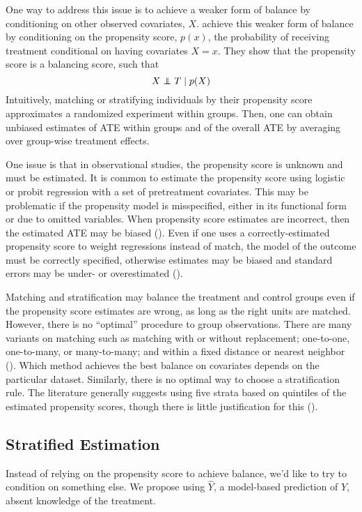 \documentclass[12pt]{article}
\newcommand\independent{\protect\mathpalette{\protect\independenT}{\perp}}
\def\independenT#1#2{\mathrel{\rlap{$#1#2$}\mkern2mu{#1#2}}}
\begin{document}
One way to address this issue is to achieve a weaker form of balance by conditioning on other observed covariates, $X$.
\citet{rosenbaum_central_1983} achieve this weaker form of balance by conditioning on the propensity score, $p(x)$, the probability of receiving treatment conditional on having covariates $X=x$.
They show that the propensity score is a balancing score, such that
$$X \independent T \mid p(X)$$
Intuitively, matching or stratifying individuals by their propensity score approximates a randomized experiment within groups.
Then, one can obtain unbiased estimates of ATE within groups and of the overall ATE by averaging over group-wise treatment effects. 

One issue is that in observational studies, the propensity score is unknown and must be estimated.
It is common to estimate the propensity score using logistic or probit regression with a set of pretreatment covariates.
This may be problematic if the propensity model is misspecified, either in its functional form or due to omitted variables.
When propensity score estimates are incorrect, then the estimated ATE may be biased (\cite{drake_effects_1993}).
Even if one uses a correctly-estimated propensity score to weight regressions instead of match, the model of the outcome must be correctly specified, otherwise estimates may be biased and standard errors may be under- or overestimated (\cite{freedman_weighting_2008}). 

Matching and stratification may balance the treatment and control groups even if the propensity score estimates are wrong, as long as the right units are matched.
However, there is no ``optimal'' procedure to group observations.
There are many variants on matching such as matching with or without replacement; one-to-one, one-to-many, or many-to-many; and within a fixed distance or nearest neighbor (\cite{austin_comparison_2014}). 
Which method achieves the best balance on covariates depends on the particular dataset.
Similarly, there is no optimal way to choose a stratification rule.
The literature generally suggests using five strata based on quintiles of the estimated propensity scores, though there is little justification for this (\cite{austin_comparison_2007}).



\subsection{Stratified Estimation}
Instead of relying on the propensity score to achieve balance, we'd like to try to condition on something else.
We propose using $\hat{Y}$, a model-based prediction of $Y$, absent knowledge of the treatment. 
\end{document}

